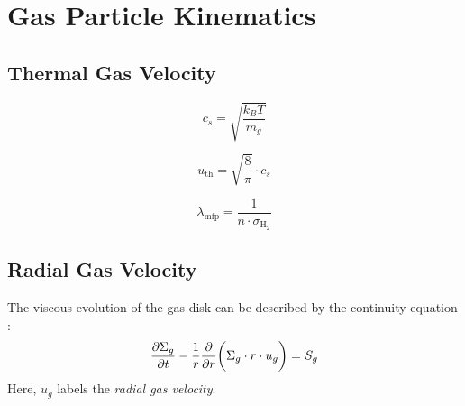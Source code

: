          \\
         \\  %


        \clearpage
        


\newpage\section{Gas Particle Kinematics}


    \subsection{Thermal Gas Velocity}

        \begin{equation}
            c_s = \sqrt{\frac{k_BT}{m_g}}
        \end{equation}

        \begin{equation}
            u_\text{th} = \sqrt{\frac{8}{\pi}} \cdot c_s
        \end{equation}

        \begin{equation}
            \lambda_\text{mfp} = \frac{1}{n \cdot \sigma_{\text{H}_2}}
        \end{equation}

        

    \newpage\subsection{Radial Gas Velocity}


        The viscous evolution of the gas disk can be described by the continuity equation 
        \cite{birnstiel_dullemond_brauer_2010}:
        \begin{equation}
            \frac{\partial \Sigma_g}{\partial t}-\frac{1}{r}\frac{\partial }{\partial r}\bigg(\Sigma_g \cdot r \cdot u_g\bigg) = S_g
        \end{equation}
        Here, $u_g$ labels the \textit{radial gas velocity}.
        \\

